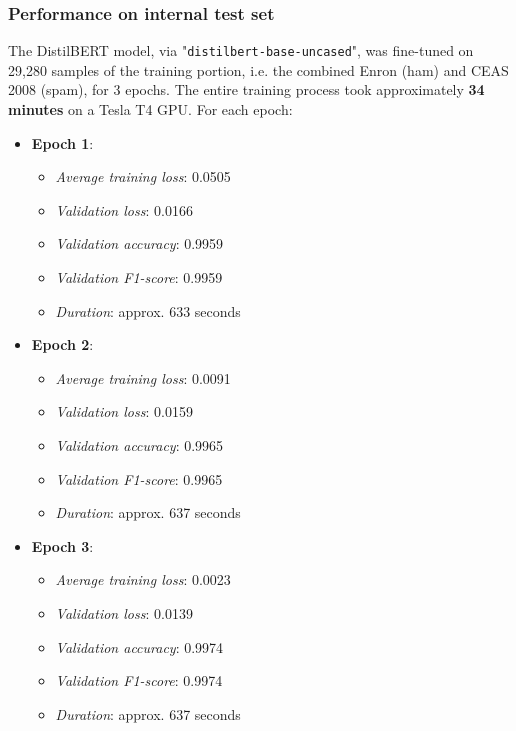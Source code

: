 
\subsubsection*{Performance on internal test set}
The DistilBERT model, via "\texttt{distilbert-base-uncased}", was fine-tuned on 29,280 samples of the training portion, i.e. the combined Enron (ham) and CEAS 2008 (spam), for 3 epochs. The entire training process took approximately \textbf{34 minutes} on a Tesla T4 GPU. For each epoch:

\begin{itemize}
  \item \textbf{Epoch 1}:
  \begin{itemize}
    \item \textit{Average training loss}: 0.0505
    \item \textit{Validation loss}: 0.0166
    \item \textit{Validation accuracy}: 0.9959
    \item \textit{Validation F1-score}: 0.9959
    \item \textit{Duration}: approx. 633 seconds
  \end{itemize}
  \item \textbf{Epoch 2}:
  \begin{itemize}
    \item \textit{Average training loss}: 0.0091
    \item \textit{Validation loss}: 0.0159
    \item \textit{Validation accuracy}: 0.9965
    \item \textit{Validation F1-score}: 0.9965
    \item \textit{Duration}: approx. 637 seconds
  \end{itemize}
  \item \textbf{Epoch 3}:
  \begin{itemize}
    \item \textit{Average training loss}: 0.0023
    \item \textit{Validation loss}: 0.0139
    \item \textit{Validation accuracy}: 0.9974
    \item \textit{Validation F1-score}: 0.9974
    \item \textit{Duration}: approx. 637 seconds
  \end{itemize}
\end{itemize}


